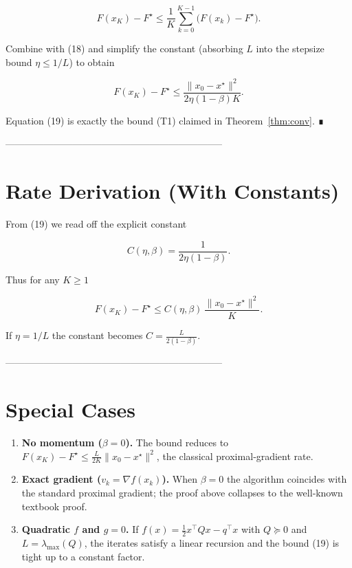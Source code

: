 \documentclass{article}
\begin{document}
\[
F(x_{K})-F^\star\le\frac{1}{K}\sum_{k=0}^{K-1}\bigl(F(x_{k})-F^\star\bigr).
\]

Combine with (18) and simplify the constant (absorbing $L$ into the stepsize bound $\eta\le1/L$) to obtain

\[
F(x_{K})-F^\star
\le \frac{\|x_{0}-x^\star\|^{2}}{2\eta(1-\beta)K}.
\tag{19}
\]

Equation (19) is exactly the bound (T1) claimed in Theorem~\ref{thm:conv}. ∎

--------------------------------------------------------------------

\section*{Rate Derivation (With Constants)}
From (19) we read off the explicit constant  

\[
C(\eta,\beta)=\frac{1}{2\eta(1-\beta)} .
\]

Thus for any $K\ge1$

\[
F(x_{K})-F^\star\le C(\eta,\beta)\,\frac{\|x_{0}-x^\star\|^{2}}{K}.
\]

If $\eta=1/L$ the constant becomes $C = \frac{L}{2(1-\beta)}$.

--------------------------------------------------------------------

\section*{Special Cases}
\begin{enumerate}
\item \textbf{No momentum ($\beta=0$).}  
The bound reduces to $F(x_K)-F^\star\le\frac{L}{2K}\|x_0-x^\star\|^2$, the classical proximal‑gradient rate.

\item \textbf{Exact gradient ($v_k=\nabla f(x_k)$).}  
When $\beta=0$ the algorithm coincides with the standard proximal gradient; the proof above collapses to the well‑known textbook proof.

\item \textbf{Quadratic $f$ and $g=0$.}  
If $f(x)=\frac12 x^\top Q x-q^\top x$ with $Q\succeq 0$ and $L=\lambda_{\max}(Q)$, the iterates satisfy a linear recursion and the bound (19) is tight up to a constant factor.

\end{enumerate}
\end{document}
